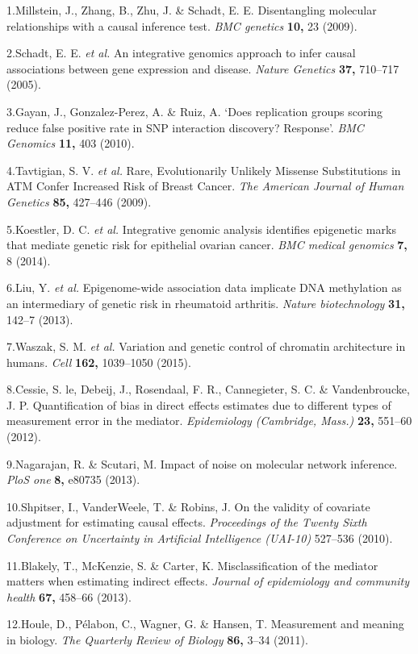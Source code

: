 \documentclass[]{article}
\begin{document}
1.Millstein, J., Zhang, B., Zhu, J. \& Schadt, E. E. Disentangling
molecular relationships with a causal inference test. \emph{BMC
genetics} \textbf{10,} 23 (2009).

2.Schadt, E. E. \emph{et al.} An integrative genomics approach to infer
causal associations between gene expression and disease. \emph{Nature
Genetics} \textbf{37,} 710--717 (2005).

3.Gayan, J., Gonzalez-Perez, A. \& Ruiz, A. `Does replication groups
scoring reduce false positive rate in SNP interaction discovery?
Response'. \emph{BMC Genomics} \textbf{11,} 403 (2010).

4.Tavtigian, S. V. \emph{et al.} Rare, Evolutionarily Unlikely Missense
Substitutions in ATM Confer Increased Risk of Breast Cancer. \emph{The
American Journal of Human Genetics} \textbf{85,} 427--446 (2009).

5.Koestler, D. C. \emph{et al.} Integrative genomic analysis identifies
epigenetic marks that mediate genetic risk for epithelial ovarian
cancer. \emph{BMC medical genomics} \textbf{7,} 8 (2014).

6.Liu, Y. \emph{et al.} Epigenome-wide association data implicate DNA
methylation as an intermediary of genetic risk in rheumatoid arthritis.
\emph{Nature biotechnology} \textbf{31,} 142--7 (2013).

7.Waszak, S. M. \emph{et al.} Variation and genetic control of chromatin
architecture in humans. \emph{Cell} \textbf{162,} 1039--1050 (2015).

8.Cessie, S. le, Debeij, J., Rosendaal, F. R., Cannegieter, S. C. \&
Vandenbroucke, J. P. Quantification of bias in direct effects estimates
due to different types of measurement error in the mediator.
\emph{Epidemiology (Cambridge, Mass.)} \textbf{23,} 551--60 (2012).

9.Nagarajan, R. \& Scutari, M. Impact of noise on molecular network
inference. \emph{PloS one} \textbf{8,} e80735 (2013).

10.Shpitser, I., VanderWeele, T. \& Robins, J. On the validity of
covariate adjustment for estimating causal effects. \emph{Proceedings of
the Twenty Sixth Conference on Uncertainty in Artificial Intelligence
(UAI-10)} 527--536 (2010).

11.Blakely, T., McKenzie, S. \& Carter, K. Misclassification of the
mediator matters when estimating indirect effects. \emph{Journal of
epidemiology and community health} \textbf{67,} 458--66 (2013).

12.Houle, D., P{é}labon, C., Wagner, G. \& Hansen, T. Measurement and
meaning in biology. \emph{The Quarterly Review of Biology} \textbf{86,}
3--34 (2011).
\end{document}
